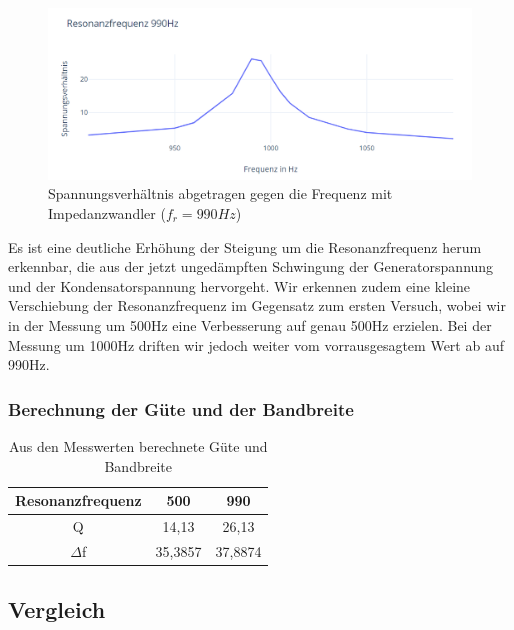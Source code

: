 \documentclass{article}
\begin{document}
\begin{figure}[h]
  \begin{center}
    \includegraphics[scale=0.75]{../assets/images/ETP3/Fre990Plot5.PNG}
    \caption{Spannungsverhältnis abgetragen gegen die Frequenz mit Impedanzwandler ($f_r = 990Hz$)}
  \end{center}
\end{figure}
Es ist eine deutliche Erhöhung der Steigung um die Resonanzfrequenz herum erkennbar, die aus der jetzt ungedämpften Schwingung
der Generatorspannung und der Kondensatorspannung hervorgeht. Wir erkennen zudem eine kleine Verschiebung der Resonanzfrequenz im Gegensatz zum ersten Versuch,
wobei wir in der Messung um 500Hz eine Verbesserung auf genau 500Hz erzielen. Bei der Messung um 1000Hz driften wir jedoch weiter vom vorrausgesagtem Wert ab auf 990Hz.

\newpage

\subsubsection{Berechnung der Güte und der Bandbreite}

\begin{table}[h!]
  \begin{center}
    \begin{tabular}{|c|c|c|}
      \hline
      Resonanzfrequenz & 500 & 990 \\
      \hline
      Q                &  14,13   &  26,13   \\
      \hline
      $\Delta$f        &  35,3857   &  37,8874   \\
      \hline
    \end{tabular}
    \caption{Aus den Messwerten berechnete Güte und Bandbreite}
    \label{tab:zMGB}
  \end{center}
\end{table}



\subsection{Vergleich}
\end{document}
